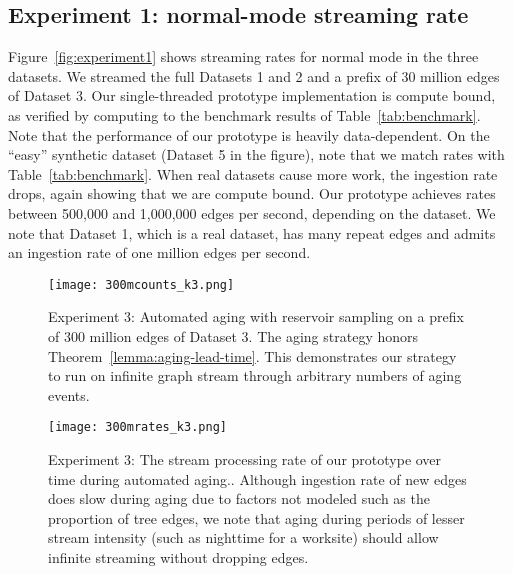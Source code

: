 \subsection{Experiment 1: \XSCC normal-mode streaming rate}

Figure~\ref{fig:experiment1} shows \XSCC streaming rates for normal mode in
the three datasets.  We streamed the full Datasets 1 and 2 and a prefix of
30 million edges of Dataset 3.  Our single-threaded prototype implementation
is compute bound, as verified by computing to the benchmark results of
Table~\ref{tab:benchmark}.  Note that the performance of our prototype is
heavily data-dependent.  On the ``easy'' synthetic dataset (Dataset 5 in
the figure), note that we match rates with Table~\ref{tab:benchmark}.  When
real datasets cause more work, the ingestion rate drops, again showing that
we are compute bound.  Our prototype achieves rates between 500,000 and
1,000,000 edges per second, depending on the dataset. We note that Dataset 1,
which is a real dataset, has many repeat edges and admits an ingestion
rate of one million edges per second.

\begin{figure}[htb]
\begin{center}
\texttt{[image: 300mcounts\_k3.png]}
\end{center}
\caption{Experiment 3: Automated aging with reservoir sampling on a
prefix of 300 million edges of Dataset 3.  The aging strategy
honors Theorem~\ref{lemma:aging-lead-time}.  This demonstrates
our strategy to run on infinite graph stream through arbitrary numbers
of aging events. \label{fig:experiment3}}

\end{figure}

\begin{figure}[htb]
\begin{center}
\texttt{[image: 300mrates\_k3.png]}
\end{center}
\caption{Experiment 3: The stream processing rate of our
prototype over time during
automated aging.\label{fig:experiment3-rates}.  
Although ingestion rate of new edges does slow during aging due
to factors not modeled such as the proportion of tree edges,
we note that aging during periods of lesser stream intensity 
(such as nighttime for a worksite) should allow infinite 
streaming without dropping edges.
}
\end{figure}

